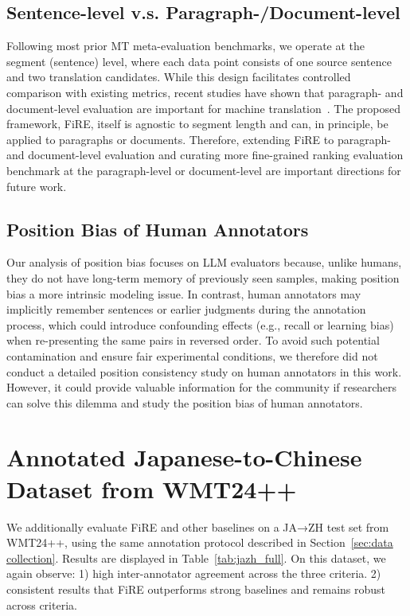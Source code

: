 \documentclass{article}
\theoremstyle{plain}
\theoremstyle{definition}
\theoremstyle{remark}
\newcommand{\ours}{FiRE }
\begin{document}
\subsection{Sentence-level v.s. Paragraph-/Document-level} Following most prior MT meta-evaluation benchmarks, we operate at the segment (sentence) level, where each data point consists of one source sentence and two translation candidates. While this design facilitates controlled comparison with existing metrics, recent studies have shown that paragraph- and document-level evaluation are important for machine translation~\citep{deutsch2023training,Sun2024FineGrainedAM}. The proposed framework, FiRE, itself is agnostic to segment length and can, in principle, be applied to paragraphs or documents. Therefore, extending \ours to paragraph- and document-level evaluation and curating more fine-grained ranking evaluation benchmark at the paragraph-level or document-level are important directions for future work. 
\subsection{Position Bias of Human Annotators}
Our analysis of position bias focuses on LLM evaluators because, unlike humans, they do not have long-term memory of previously seen samples, making position bias a more intrinsic modeling issue. In contrast, human annotators may implicitly remember sentences or earlier judgments during the annotation process, which could introduce confounding effects (e.g., recall or learning bias) when re-presenting the same pairs in reversed order. To avoid such potential contamination and ensure fair experimental conditions, we therefore did not conduct a detailed position consistency study on human annotators in this work. However, it could provide valuable information for the community if researchers can solve this dilemma and study the position bias of human annotators.



\section{Annotated Japanese-to-Chinese Dataset from WMT24++}
We additionally evaluate \ours and other baselines on a JA→ZH test set from WMT24++, using the same annotation protocol described in Section~\ref{sec:data collection}. Results are displayed in Table~\ref{tab:jazh_full}. On this dataset, we again observe: 1) high inter-annotator agreement across the three criteria. 2) consistent results that FiRE outperforms strong baselines and remains robust across criteria.
\end{document}
